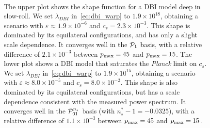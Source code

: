 \begin{figure}[!pth]
\centering
    \\[-2ex]
\caption{
    The upper plot shows the shape function for a DBI model
    deep in slow-roll. We set
    $\lambda_{DBI}$ in~\eqref{eq:dbi_warp} to $1.9\times10^{18}$,
    obtaining a scenario with $\varepsilon\approx1.9\times10^{-6}$ and
    $c_s=2.3\times10^{-3}$.
    This shape is dominated by its equilateral configurations,
    and has only a slight scale dependence.
    It converges well in the $\mathcal{P}_1$ basis,
    with a relative difference of $2.1\times10^{-3}$
    between $p_\text{max}=45$ and $p_\text{max}=15$.
    The lower plot shows a DBI model that saturates the {\it{Planck}}
    limit on $c_s$. We set
    $\lambda_{DBI}$ in~\eqref{eq:dbi_warp} to $1.9\times10^{15}$,
    obtaining a scenario with $\varepsilon\approx8.0\times10^{-5}$ and
    $c_s=8.0\times10^{-2}$.
    This shape is also dominated by its equilateral configurations,
    but has a scale dependence consistent with the measured
    power spectrum.
    It converges well in the $\mathcal{P}^{n_s}_{01}$ basis
    (with $n_s^{*}-1 = -0.0325$),
    with a relative difference of $1.1\times10^{-3}$
    between $p_\text{max}=45$ and $p_\text{max}=15$.
}\label{slice_plot_dbi}
\end{figure}


